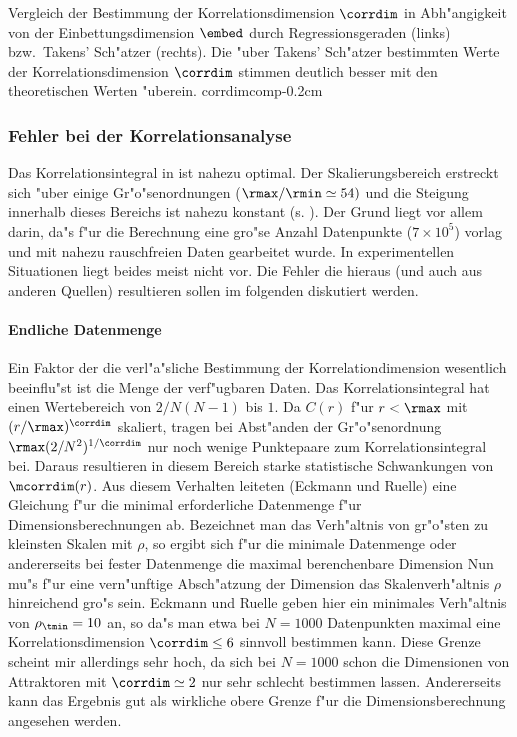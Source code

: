 {
Vergleich der Bestimmung der Korrelationsdimension $\corrdim$ in Abh"angigkeit von der
Einbettungsdimension $\embed$ durch Regressionsgeraden (links) bzw.\   Takens'
Sch"atzer (rechts). Die "uber Takens' Sch"atzer bestimmten Werte der Korrelationsdimension 
$\corrdim$ stimmen deutlich besser mit den theoretischen Werten "uberein. 
} 
{corrdimcomp}{-0.2cm}
\subsubsection{Fehler bei der Korrelationsanalyse}

Das Korrelationsintegral in  ist nahezu optimal. Der Skalierungsbereich 
erstreckt sich "uber einige Gr"o"senordnungen ($\rmax/\rmin\simeq 54)$ und die Steigung innerhalb
dieses Bereichs ist nahezu konstant (s. ). Der Grund liegt vor allem
darin, da"s f"ur die Berechnung eine gro"se Anzahl Datenpunkte ($7\times10^5$) vorlag und
mit nahezu rauschfreien Daten gearbeitet wurde. In experimentellen Situationen liegt
beides meist nicht vor. Die Fehler die hieraus (und auch aus anderen Quellen) resultieren
sollen im folgenden diskutiert werden.




\paragraph{Endliche Datenmenge}
Ein Faktor der die verl"a"sliche Bestimmung der Korrelationdimension wesentlich
beeinflu"st ist die Menge der verf"ugbaren Daten. Das Korrelationsintegral hat einen
Wertebereich von $2/N(N-1)$ bis $1$. Da $C(r)$ f"ur $r<\rmax$ mit $(r/\rmax)^\corrdim$ skaliert, tragen
bei Abst"anden der Gr"o"senordnung $\rmax(2/N^2)^{1/\corrdim}$ nur noch wenige Punktepaare 
zum Korrelationsintegral bei. Daraus resultieren in diesem Bereich starke statistische
Schwankungen von $\mcorrdim(r)$. Aus diesem Verhalten leiteten \autor(Eckmann und Ruelle)
\cite{eckmann-ruelle2} eine Gleichung f"ur die minimal erforderliche Datenmenge f"ur
Dimensionsberechnungen ab. Bezeichnet man das Verh"altnis von gr"o"sten zu kleinsten
Skalen mit $\rho$, so ergibt sich f"ur die minimale Datenmenge
oder andererseits bei fester Datenmenge die maximal berenchenbare Dimension
Nun mu"s f"ur eine vern"unftige Absch"atzung der Dimension das Skalenverh"altnis $\rho$
hinreichend gro"s sein. Eckmann und Ruelle geben hier ein minimales Verh"altnis von
$\rho_\tmin=10$ an, so da"s man etwa bei $N=1000$ Datenpunkten maximal eine
Korrelationsdimension $\corrdim\leq 6$ sinnvoll bestimmen kann. Diese Grenze scheint mir
allerdings sehr hoch, da sich bei $N=1000$ schon die Dimensionen von Attraktoren mit
$\corrdim\simeq 2$ nur sehr schlecht bestimmen lassen. Andererseits kann das Ergebnis gut
als wirkliche obere Grenze f"ur die Dimensionsberechnung angesehen werden. 




